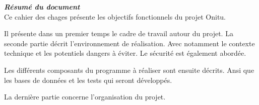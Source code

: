 \thispagestyle{empty}
\vspace*{10mm}

\textbf{\emph{\textcolor{epiBlue}{Résumé du document} } }\\

Ce cahier des chages présente les objectifs fonctionnels du projet Onitu.

Il présente dans un premier temps le cadre de travail autour du projet.
La seconde partie décrit l'environnement de réalisation. Avec notamment le contexte technique et les potentiels dangers à éviter. Le sécurité est également abordée.

Les différents composants du programme à réaliser sont ensuite décrits. Ansi que les bases de données et les tests qui seront développés.

La dernière partie concerne l'organisation du projet.

\newpage

